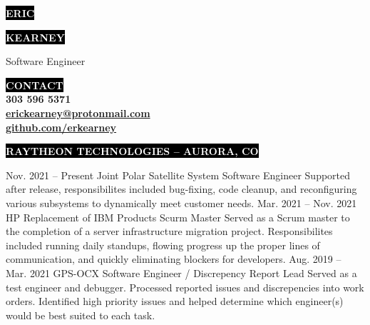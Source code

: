 \documentclass[8pt]{resumeclass}
\begin{document}

\begin{minipage}[t]{0.65\textwidth}							%
	\vspace{-\baselineskip}								%

	\colorbox{black}{\huge\textcolor{white}{\textbf{\MakeUppercase{Eric}}}}

	\colorbox{black}{\huge\textcolor{white}{\textbf{\MakeUppercase{Kearney}}}}
	
	\vspace{6pt}

	{\huge Software Engineer}
\end{minipage}
\begin{minipage}[t]{0.35\textwidth}							%
	\vspace{-\baselineskip}
	\vspace{15pt}
	\colorbox{black}{\textcolor{white}{\textbf{\MakeUppercase{Contact}}}}\\
	{\textbf{303 596 5371}}\\
	{\href{mailto:erickearney@protonmail.com}{\textbf{erickearney@protonmail.com}}}\\
	{\href{https://github.com/erkearney}{\textbf{github.com/erkearney}}}\\
\end{minipage}

\vspace{3pt}


\colorbox{black}{\small\textcolor{white}{\textbf{\MakeUppercase{Raytheon Technologies -- Aurora, CO}}}}
\vspace{6pt}

\begin{entrylist}
	\entry
		{Nov. 2021 -- Present}
		{Joint Polar Satellite System}
		{Software Engineer}
		{Supported after release, responsibilites included bug-fixing, code cleanup, and reconfiguring various subsystems to dynamically meet customer needs.}
	\entry
		{Mar. 2021 -- Nov. 2021}
		{HP Replacement of IBM Products}
		{Scurm Master}
		{Served as a Scrum master to the completion of a server infrastructure migration project. Responsibilites included running daily standups, flowing progress up the proper lines of communication, and quickly eliminating blockers for developers.}
	\entry
		{Aug. 2019 -- Mar. 2021}
		{GPS-OCX}
		{Software Engineer / Discrepency Report Lead}
		{Served as a test engineer and debugger. Processed reported issues and discrepencies into work orders. Identified high priority issues and helped determine which engineer(s) would be best suited to each task.}
\end{entrylist}
\end{document}
